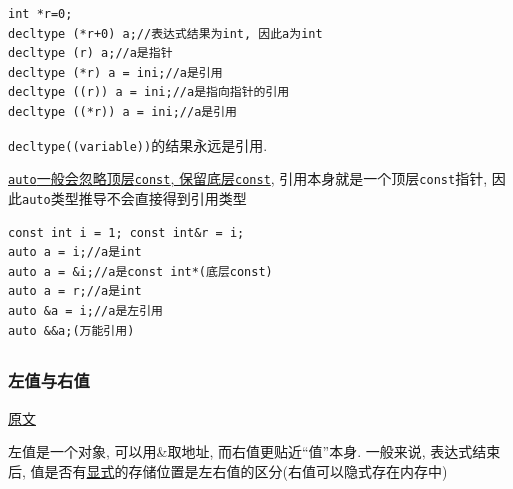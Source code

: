 \begin{paracol}{2}
	\begin{leftcolumn}
		\begin{lstlisting}[title=decltype,basicstyle=\small,columns=flexible,xleftmargin=1em,xrightmargin=1em]
int *r=0;
decltype (*r+0) a;//表达式结果为int, 因此a为int
decltype (r) a;//a是指针
decltype (*r) a = ini;//a是引用
decltype ((r)) a = ini;//a是指向指针的引用
decltype ((*r)) a = ini;//a是引用 
		\end{lstlisting}
		{\tt decltype((variable))}的结果永远是引用.
	\end{leftcolumn}
	\begin{rightcolumn}
		\uline{{\tt auto}一般会忽略顶层{\tt const}, 保留底层{\tt const}}, 引用本身就是一个顶层{\tt const}指针, 因此{\tt auto}类型推导不会直接得到引用类型
		\begin{lstlisting}[basicstyle=\small,columns=flexible,xleftmargin=2em,xrightmargin=2em]
const int i = 1; const int&r = i;
auto a = i;//a是int
auto a = &i;//a是const int*(底层const)
auto a = r;//a是int
auto &a = i;//a是左引用
auto &&a;(万能引用)
		\end{lstlisting}
	\end{rightcolumn}
\end{paracol}
\subsection{\color{purple}{左右值}}
\subsubsection{左值与右值}
 \href{https://zhuanlan.zhihu.com/p/402251966}{原文}

左值是一个对象, 可以用\&取地址, 而右值更贴近“值”本身. 一般来说, 表达式结束后, 
	值是否有\uline{显式}的存储位置是左右值的区分(右值可以隐式存在内存中)

